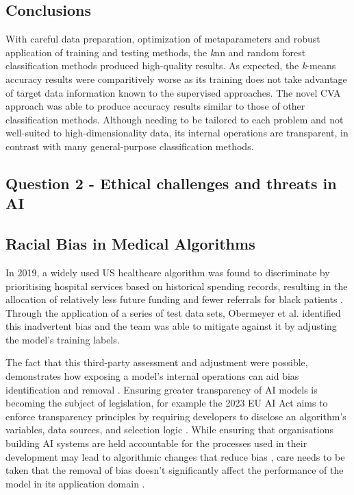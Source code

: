 \documentclass[a4paper, 11pt]{article}
\begin{document}
\subsection*{Conclusions}

With careful data preparation, optimization of metaparameters and robust application of training and testing methods, 
the \textit{k}nn and random forest classification methods produced high-quality results. 
As expected, the \textit{k}-means accuracy results were comparitively worse
as its training does not take advantage of target data information known to the supervised approaches. 
The novel CVA approach was able to produce accuracy results similar to those of other classification methods. 
Although needing to be tailored to each problem and not well-suited to high-dimensionality data, 
its internal operations are transparent, in contrast with many general-purpose classification methods. 

\begin{center}
\subsection*{Question 2 - Ethical challenges and threats in AI}
\end{center}

\subsection*{Racial Bias in Medical Algorithms}

In 2019, a widely used US healthcare algorithm was found to discriminate by prioritising hospital services based on historical spending records, resulting in the allocation of relatively less future funding and fewer referrals for black patients \cite{Jemielity2019, Ledford2019}. Through the application of a series of test data sets, Obermeyer et al. \cite{Obermeyer2019} identified this inadvertent bias and the team was able to mitigate against it by adjusting the model’s training labels. 

The fact that this third-party assessment and adjustment were possible, demonstrates how exposing a model’s internal operations can aid bias identification and removal \cite{Seroussi2020, Winter2023}. Ensuring greater transparency of AI models is becoming the subject of legislation, for example the 2023 EU AI Act aims to enforce transparency principles by requiring developers to disclose an algorithm’s variables, data sources, and selection logic \cite{EuropeanParliament2023, Edwards2021}. While ensuring that organisations building AI systems are held accountable for the processes used in their development may lead to algorithmic changes that reduce bias \cite{Donovan2018, Lawry2020}, care needs to be taken that the removal of bias doesn't significantly affect the performance of the model in its application domain \cite{Kearns2020}.
\end{document}
